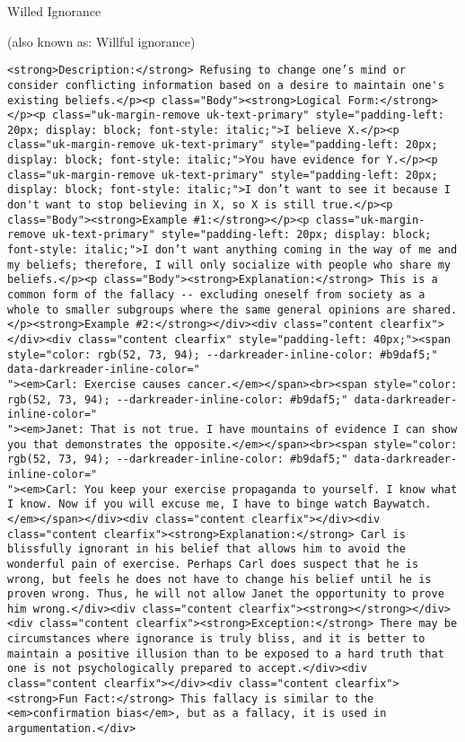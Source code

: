 \documentclass[a4paper,12pt,single,pdftex]{scrartcl}
\begin{document}
  

Willed Ignorance
    
      (also known as: Willful ignorance)
    \\

  
    \begin{verbatim}<strong>Description:</strong> Refusing to change one’s mind or consider conflicting information based on a desire to maintain one's existing beliefs.</p><p class="Body"><strong>Logical Form:</strong></p><p class="uk-margin-remove uk-text-primary" style="padding-left: 20px; display: block; font-style: italic;">I believe X.</p><p class="uk-margin-remove uk-text-primary" style="padding-left: 20px; display: block; font-style: italic;">You have evidence for Y.</p><p class="uk-margin-remove uk-text-primary" style="padding-left: 20px; display: block; font-style: italic;">I don’t want to see it because I don't want to stop believing in X, so X is still true.</p><p class="Body"><strong>Example #1:</strong></p><p class="uk-margin-remove uk-text-primary" style="padding-left: 20px; display: block; font-style: italic;">I don’t want anything coming in the way of me and my beliefs; therefore, I will only socialize with people who share my beliefs.</p><p class="Body"><strong>Explanation:</strong> This is a common form of the fallacy -- excluding oneself from society as a whole to smaller subgroups where the same general opinions are shared.</p><strong>Example #2:</strong></div><div class="content clearfix"></div><div class="content clearfix" style="padding-left: 40px;"><span style="color: rgb(52, 73, 94); --darkreader-inline-color: #b9daf5;" data-darkreader-inline-color="
"><em>Carl: Exercise causes cancer.</em></span><br><span style="color: rgb(52, 73, 94); --darkreader-inline-color: #b9daf5;" data-darkreader-inline-color="
"><em>Janet: That is not true. I have mountains of evidence I can show you that demonstrates the opposite.</em></span><br><span style="color: rgb(52, 73, 94); --darkreader-inline-color: #b9daf5;" data-darkreader-inline-color="
"><em>Carl: You keep your exercise propaganda to yourself. I know what I know. Now if you will excuse me, I have to binge watch Baywatch.</em></span></div><div class="content clearfix"></div><div class="content clearfix"><strong>Explanation:</strong> Carl is blissfully ignorant in his belief that allows him to avoid the wonderful pain of exercise. Perhaps Carl does suspect that he is wrong, but feels he does not have to change his belief until he is proven wrong. Thus, he will not allow Janet the opportunity to prove him wrong.</div><div class="content clearfix"><strong></strong></div><div class="content clearfix"><strong>Exception:</strong> There may be circumstances where ignorance is truly bliss, and it is better to maintain a positive illusion than to be exposed to a hard truth that one is not psychologically prepared to accept.</div><div class="content clearfix"></div><div class="content clearfix"><strong>Fun Fact:</strong> This fallacy is similar to the <em>confirmation bias</em>, but as a fallacy, it is used in argumentation.</div>\end{verbatim}
  
\end{document}
